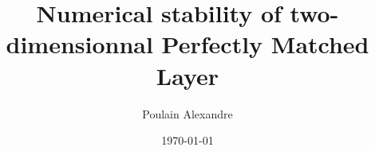 \documentclass[11pt]{article}
\title{Numerical stability of two-dimensionnal Perfectly Matched Layer}
\author{Poulain Alexandre}
\date{\today}
\begin{document}
\pagestyle{empty}


\newpage
\renewcommand{\abstractname}{Abstract}
\begin{abstract}
   






\end{abstract}


\newpage

\tableofcontents

\newpage


\newpage




\newpage


\end{document}
